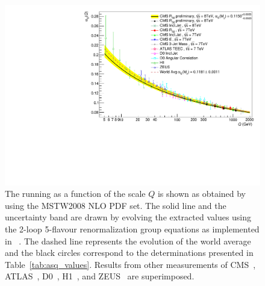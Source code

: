 %

\begin{figure}[tbp]
 \hspace*{-4mm}\includegraphics[width=1.05\textwidth]{Plots_HT_2_150/Running_alphas_8TeV_R32.pdf}
 \caption[The running \alpsq as a function of the scale $Q$.]{The running \alpsq as a function of the scale $Q$ is shown as obtained by using the MSTW2008 NLO PDF set. The solid line and the uncertainty band are drawn by evolving the extracted \alpsmz values using the 2-loop 5-flavour renormalization group equations as implemented in \RunDec~\cite{Chetyrkin:2000yt,Schmidt:2012az}. The dashed line represents the evolution of the world average~\cite{Patrignani:2016xqp} and the black circles correspond to the \alpsq determinations presented in Table~\ref{tab:asq_values}. Results from other measurements of CMS~\cite{Chatrchyan:2013txa, Chatrchyan:2013haa, Khachatryan:2014waa, CMS:2014mna, Khachatryan:2016mlc}, ATLAS~\cite{ATLAS:2015yaa}, D0~\cite{Abazov:2009nc, Abazov:2012lua}, H1~\cite{Andreev:2014wwa, Andreev:2016tgi}, and ZEUS~\cite{Abramowicz:2012jz} are superimposed.}
 \label{fig:running_alphas}
\end{figure}
\cleardoublepage
